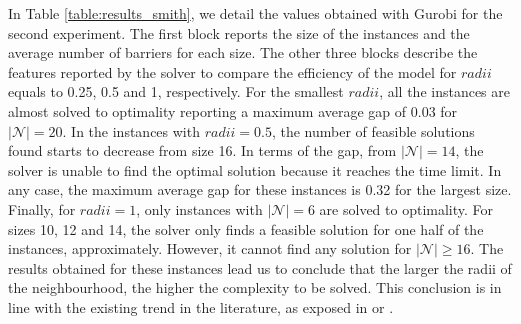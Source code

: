 \documentclass[a4paper,  review, authoryear, 1p., doubleblind]{elsarticle}
\begin{document}
In Table \ref{table:results_smith}, we detail the values obtained with Gurobi for the second experiment. The first block reports the size of the instances and the average number of barriers for each size. The other three blocks describe the features reported by the solver to compare the efficiency of the model for $radii$ equals to 0.25, 0.5 and 1, respectively. For the smallest $radii$, all the instances are almost solved to optimality reporting a maximum average gap of 0.03 for $|\mathcal N|=20$. In the instances with $radii=0.5$, the number of feasible solutions found starts to decrease from size 16. In terms of the gap, from $|\mathcal N|=14$, the solver is unable to find the optimal solution because it reaches the time limit. In any case, the maximum average gap for these instances is 0.32 for the largest size. Finally, for $radii=1$, only instances with $|\mathcal N|=6$ are solved to optimality. For sizes 10, 12 and 14, the solver only finds a feasible solution for one half of the instances, approximately. However, it cannot find any solution for $|\mathcal N|\geq 16$. The results obtained for these instances lead us to conclude that the larger the radii of the neighbourhood, the higher the complexity to be solved. This conclusion is in line with the existing trend in the literature, as exposed in \citet{puerto_routing_2022} or \citet{blanco_minimum_2017}.
\end{document}
